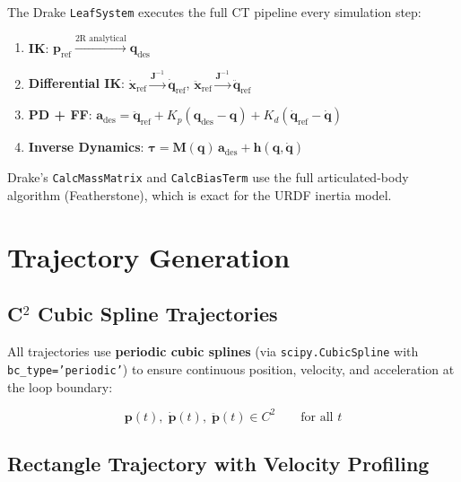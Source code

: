 \documentclass[11pt,a4paper]{article}
\newcommand{\bq}{\bm{q}}
\newcommand{\bdq}{\dot{\bm{q}}}
\newcommand{\bddq}{\ddot{\bm{q}}}
\newcommand{\btau}{\bm{\tau}}
\newcommand{\bM}{\bm{M}}
\newcommand{\bh}{\bm{h}}
\newcommand{\bJ}{\bm{J}}
\begin{document}
\begin{codemath}
The Drake \texttt{LeafSystem} executes the full CT pipeline every simulation step:
\begin{enumerate}
    \item \textbf{IK}: $\bm{p}_{\mathrm{ref}} \xrightarrow{\text{2R analytical}} \bq_{\mathrm{des}}$
    \item \textbf{Differential IK}: $\dot{\bm{x}}_{\mathrm{ref}} \xrightarrow{\bJ^{-1}} \bdq_{\mathrm{ref}}$, \quad $\ddot{\bm{x}}_{\mathrm{ref}} \xrightarrow{\bJ^{-1}} \bddq_{\mathrm{ref}}$
    \item \textbf{PD + FF}: $\bm{a}_{\mathrm{des}} = \bddq_{\mathrm{ref}} + K_p(\bq_{\mathrm{des}} - \bq) + K_d(\bdq_{\mathrm{ref}} - \bdq)$
    \item \textbf{Inverse Dynamics}: $\btau = \bM(\bq)\,\bm{a}_{\mathrm{des}} + \bh(\bq, \bdq)$
\end{enumerate}

Drake's \texttt{CalcMassMatrix} and \texttt{CalcBiasTerm} use the full articulated-body algorithm (Featherstone), which is exact for the URDF inertia model.
\end{codemath}


\section{Trajectory Generation}
\label{sec:trajectory}

\subsection{C$^2$ Cubic Spline Trajectories}

All trajectories use \textbf{periodic cubic splines} (via \texttt{scipy.CubicSpline} with \texttt{bc\_type='periodic'}) to ensure continuous position, velocity, and acceleration at the loop boundary:

\begin{equation}
    \bm{p}(t), \; \dot{\bm{p}}(t), \; \ddot{\bm{p}}(t) \in C^2 \qquad \text{for all } t
\end{equation}

\subsection{Rectangle Trajectory with Velocity Profiling}
\end{document}
